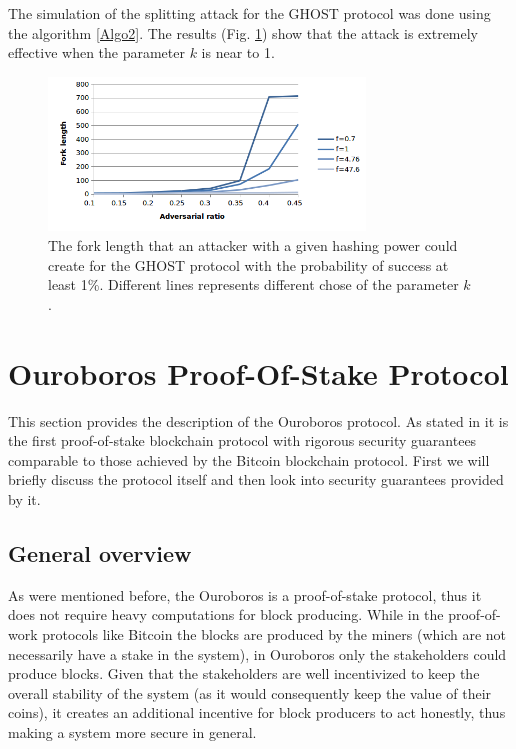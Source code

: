 \documentclass[10pt,a4paper]{article}
\numberwithin{equation}{section} %
\theoremstyle{plain}
\theoremstyle{definition}
\theoremstyle{remark}
\begin{document}
	The simulation of the splitting attack for the GHOST protocol was done using the algorithm \ref{Algo2}. The results (Fig. \ref{fig:ghost_split_chart}) show that the attack is extremely effective when the parameter \(k\) is near to 1.
	
	\begin{figure}[h] 
        \centering
        \includegraphics[width=0.75\textwidth]{ghost_split_chart}
        \caption{The fork length that an attacker with a given hashing power could create for the GHOST protocol with the probability of success at least 1\%. Different lines represents different chose of the parameter \(k\).}
        \label{fig:ghost_split_chart}
    \end{figure}
	
	\section{Ouroboros Proof-Of-Stake Protocol}
	
	This section provides the description of the Ouroboros protocol. As stated in \cite{KRDO16} it is the first proof-of-stake blockchain protocol with rigorous security guarantees comparable to those achieved by the Bitcoin blockchain protocol.
	First we will briefly discuss the protocol itself and then look into security guarantees provided by it.
	
	\subsection{General overview}
	
	As were mentioned before, the Ouroboros is a proof-of-stake protocol, thus it does not require heavy computations for block producing. While in the proof-of-work protocols like Bitcoin the blocks are produced by the miners (which are not necessarily have a stake in the system), in Ouroboros only the stakeholders could produce blocks. Given that the stakeholders are well incentivized to keep the overall stability of the system (as it would consequently keep the value of their coins), it creates an additional incentive for block producers to act honestly, thus making a system more secure in general. 
	
\end{document}
